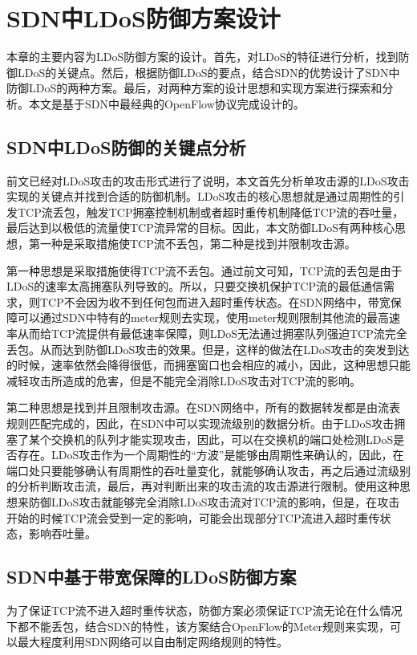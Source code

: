 \chapter{SDN中LDoS防御方案设计}
\label{cha:design}
本章的主要内容为LDoS防御方案的设计。首先，对LDoS的特征进行分析，找到防御LDoS的关键点。然后，根据防御LDoS的要点，结合SDN的优势设计了SDN中防御LDoS的两种方案。最后，对两种方案的设计思想和实现方案进行探索和分析。本文是基于SDN中最经典的OpenFlow协议完成设计的。

\section{SDN中LDoS防御的关键点分析}
\label{chap4:keyanalysis}
前文已经对LDoS攻击的攻击形式进行了说明，本文首先分析单攻击源的LDoS攻击实现的关键点并找到合适的防御机制。LDoS攻击的核心思想就是通过周期性的引发TCP流丢包，触发TCP拥塞控制机制或者超时重传机制降低TCP流的吞吐量，最后达到以极低的流量使TCP流异常的目标。因此，本文防御LDoS有两种核心思想，第一种是采取措施使TCP流不丢包，第二种是找到并限制攻击源。

第一种思想是采取措施使得TCP流不丢包。通过前文可知，TCP流的丢包是由于LDoS的速率太高拥塞队列导致的。所以，只要交换机保护TCP流的最低通信需求，则TCP不会因为收不到任何包而进入超时重传状态。在SDN网络中，带宽保障可以通过SDN中特有的meter规则去实现，使用meter规则限制其他流的最高速率从而给TCP流提供有最低速率保障，则LDoS无法通过拥塞队列强迫TCP流完全丢包。从而达到防御LDoS攻击的效果。但是，这样的做法在LDoS攻击的突发到达的时候，速率依然会降得很低，而拥塞窗口也会相应的减小，因此，这种思想只能减轻攻击所造成的危害，但是不能完全消除LDoS攻击对TCP流的影响。

第二种思想是找到并且限制攻击源。在SDN网络中，所有的数据转发都是由流表规则匹配完成的，因此，在SDN中可以实现流级别的数据分析。由于LDoS攻击拥塞了某个交换机的队列才能实现攻击，因此，可以在交换机的端口处检测LDoS是否存在。LDoS攻击作为一个周期性的“方波”是能够由周期性来确认的，因此，在端口处只要能够确认有周期性的吞吐量变化，就能够确认攻击，再之后通过流级别的分析判断攻击流，最后，再对判断出来的攻击流的攻击源进行限制。使用这种思想来防御LDoS攻击就能够完全消除LDoS攻击流对TCP流的影响，但是，在攻击开始的时候TCP流会受到一定的影响，可能会出现部分TCP流进入超时重传状态，影响吞吐量。

\section{SDN中基于带宽保障的LDoS防御方案}
\label{chap4:bandguatee}

为了保证TCP流不进入超时重传状态，防御方案必须保证TCP流无论在什么情况下都不能丢包，结合SDN的特性，该方案结合OpenFlow的Meter规则来实现，可以最大程度利用SDN网络可以自由制定网络规则的特性。

